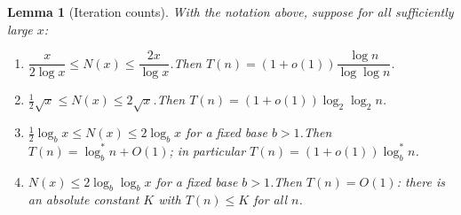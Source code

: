 \documentclass[12pt]{article}
\newtheorem{lemma}{Lemma}
\theoremstyle{definition}
\begin{document}
\begin{lemma}[Iteration counts]\label{lem:rates}
With the notation above, suppose for all sufficiently large $x$:
\begin{enumerate}
\item[(P)] $\dfrac{x}{2\log x}\le N(x)\le\dfrac{2x}{\log x}$.\quad Then
$T(n)=(1+o(1))\dfrac{\log n}{\log\log n}$.
\item[(S)] $\tfrac12\sqrt x\le N(x)\le 2\sqrt x$.\quad Then
$T(n)=(1+o(1))\log_2\log_2 n$.
\item[(L)] $\tfrac12\log_b x\le N(x)\le 2\log_b x$ for a fixed base $b>1$.\quad Then
$T(n)=\log^*_b n+O(1)$; in particular $T(n)=(1+o(1))\log^*_b n$.
\item[(D)] $N(x)\le 2\log_b\log_b x$ for a fixed base $b>1$.\quad Then $T(n)=O(1)$:
there is an absolute constant $K$ with $T(n)\le K$ for all $n$.
\end{enumerate}
\end{lemma}
\end{document}
